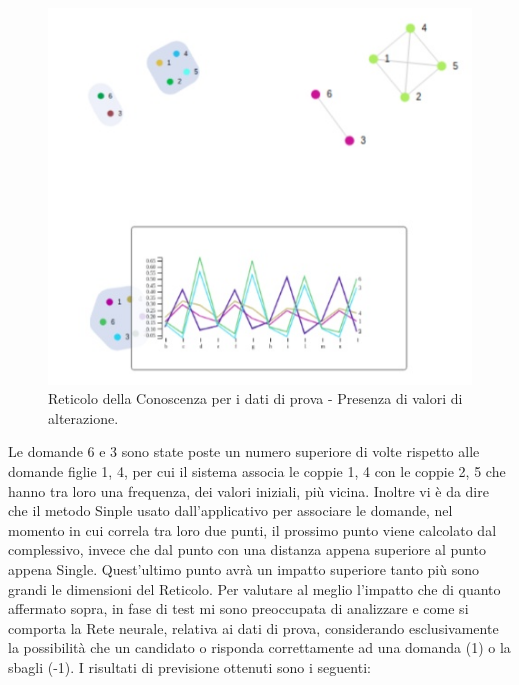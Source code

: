 \begin{figure}[H]
\centering
	\includegraphics[width=0.60\linewidth]{./image/collage_reticolo-general-PROBLEMA.png}
	\caption{Reticolo della Conoscenza per i dati di prova - Presenza di valori di alterazione.}
	\label{Reticolo della Conoscenza per i dati di prova - Presenza di valori di alterazione.}
\end{figure}
\noindent
Le domande 6 e 3 sono state poste un numero superiore di volte rispetto alle domande figlie 1, 4, per cui il sistema associa le coppie 1, 4 con le coppie 2, 5 che hanno tra loro una frequenza, dei valori iniziali, pi\`u vicina. Inoltre vi \`e da dire che il metodo Sinple usato dall'applicativo per associare le domande, nel momento in cui correla tra loro due punti, il prossimo punto viene calcolato dal complessivo, invece che dal punto con una distanza appena superiore al punto appena Single. Quest'ultimo punto avr\`a un impatto superiore tanto pi\`u sono grandi le dimensioni del Reticolo.
Per valutare al meglio l'impatto che di quanto affermato sopra, in fase di test mi sono preoccupata di analizzare e come si comporta la Rete neurale, relativa ai dati di prova, considerando esclusivamente la possibilit\`a che un candidato o risponda correttamente ad una domanda (1) o la sbagli (-1). I risultati di previsione ottenuti sono i seguenti:
